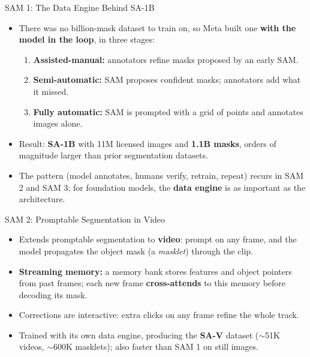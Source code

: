 \begin{frame}{SAM 1: The Data Engine Behind SA-1B}
  \begin{itemize}\itemsep0.3em
    \item There was no billion-mask dataset to train on, so Meta built one \textbf{with the model in the loop}, in three stages:
    \begin{enumerate}\itemsep0.15em
      \item \textbf{Assisted-manual:} annotators refine masks proposed by an early SAM.
      \item \textbf{Semi-automatic:} SAM proposes confident masks; annotators add what it missed.
      \item \textbf{Fully automatic:} SAM is prompted with a grid of points and annotates images alone.
    \end{enumerate}
    \item Result: \textbf{SA-1B} with 11M licensed images and \textbf{1.1B masks}, orders of magnitude larger than prior segmentation datasets.
    \item The pattern (model annotates, humans verify, retrain, repeat) recurs in SAM 2 and SAM 3; for foundation models, the \textbf{data engine} is as important as the architecture.
  \end{itemize}
\end{frame}

\begin{frame}{SAM 2: Promptable Segmentation in Video}
  \begin{itemize}\itemsep0.3em
    \item Extends promptable segmentation to \textbf{video}: prompt on any frame, and the model propagates the object mask (a \emph{masklet}) through the clip.
    \item \textbf{Streaming memory:} a memory bank stores features and object pointers from past frames; each new frame \textbf{cross-attends} to this memory before decoding its mask.
    \item Corrections are interactive: extra clicks on any frame refine the whole track.
    \item Trained with its own data engine, producing the \textbf{SA-V} dataset ($\sim$51K videos, $\sim$600K masklets); also faster than SAM 1 on still images.
  \end{itemize}
\end{frame}

